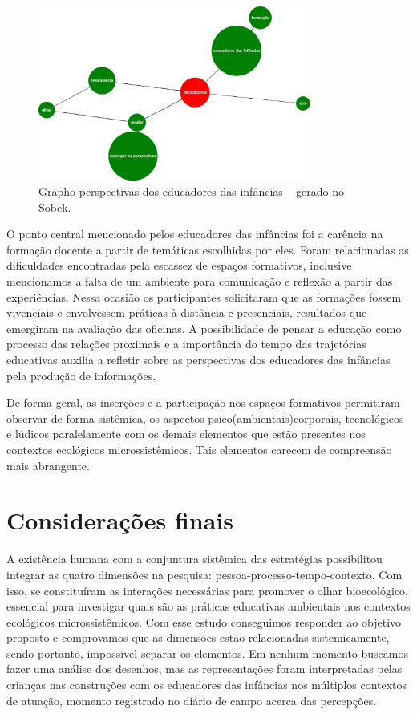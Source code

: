 \documentclass{textolivre-html}
\begin{document}
\begin{figure}[h!]
 \centering
 \includegraphics[width=0.8\textwidth]{figure09.pdf}
 \caption{Grapho perspectivas dos educadores das infâncias -- gerado no Sobek.}
 \label{fig-fig09}
\end{figure}

O ponto central mencionado pelos educadores das infâncias foi a carência na formação docente a partir de temáticas escolhidas por eles. Foram relacionadas as dificuldades encontradas pela escassez de espaços formativos, inclusive mencionamos a falta de um ambiente para comunicação e reflexão a partir das experiências. Nessa ocasião os participantes solicitaram que as formações fossem vivenciais e envolvessem práticas à distância e presenciais, resultados que emergiram na avaliação das oficinas. A possibilidade de pensar a educação como processo das relações proximais e a importância do tempo das trajetórias educativas auxilia a refletir sobre as perspectivas dos educadores das infâncias pela produção de informações.

De forma geral, as inserções e a participação nos espaços formativos permitiram observar de forma sistêmica, os aspectos psico(ambientais)corporais, tecnológicos e lúdicos paralelamente com os demais elementos que estão presentes nos contextos ecológicos microssistêmicos. Tais elementos carecem de compreensão mais abrangente.


\section{Considerações finais}\label{sec-consideracoes}
A existência humana com a conjuntura sistêmica das estratégias possibilitou integrar as quatro dimensões na pesquisa: pessoa-processo-tempo-contexto. Com isso, se constituíram as interações necessárias para promover o olhar bioecológico, essencial para investigar quais são as práticas educativas ambientais nos contextos ecológicos microssistêmicos. Com esse estudo conseguimos responder ao objetivo proposto e comprovamos que as dimensões estão relacionadas sistemicamente, sendo portanto, impossível separar os elementos. Em nenhum momento buscamos fazer uma análise dos desenhos, mas as representações foram interpretadas pelas crianças nas construções com os educadores das infâncias nos múltiplos contextos de atuação, momento registrado no diário de campo acerca das percepções.
\end{document}

